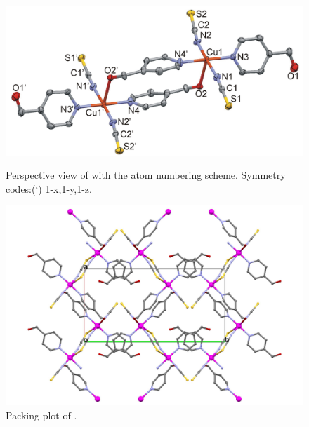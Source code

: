 \begin{figure}[!htpb]
\centering
\includegraphics[width=1\textwidth]{figures/curhomp_FIGm11.png}
\caption[Perspective view of ]{Perspective view of  with the atom numbering scheme. Symmetry codes:(‘) 1-x,1-y,1-z.}
\label{fig:CuR4HOMP_pv}
\vspace{\floatsep}
\includegraphics[width=1\textwidth]{figures/curhomp_CC.png}
\caption{Packing plot of .}
\label{fig:CuR4HOMP_packv}
\end{figure}



\renewcommand{\arraystretch}{1.5}

